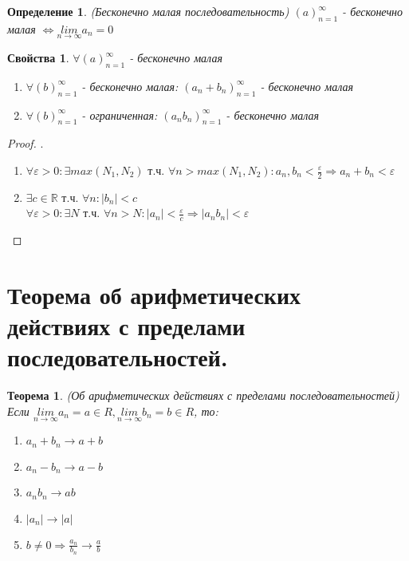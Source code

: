 \documentclass[12pt, a4]{article}
\newtheorem*{theorem}{Теорема}
\newtheorem*{definition}{Определение}
\newtheorem*{properties}{Свойства}
\renewcommand{\lim}[2]{\underset{#1 \rightarrow #2}{lim}}
\newcommand{\limn}{\lim{n}{\infty}}
\renewcommand{\implies}{\Rightarrow}
\renewcommand{\iff}{\Leftrightarrow}
\renewcommand{\epsilon}{\varepsilon}
\newcommand{\R}{\mathbb{R}}
\begin{document}
\begin{definition}(Бесконечно малая последовательность)
$(a)_{n=1}^\infty$ - бесконечно малая $\iff \limn a_n = 0$ 
\end{definition}

\begin{properties} $\forall (a)_{n=1}^\infty$ - бесконечно малая
\begin{enumerate}
    \item $\forall(b)_{n=1}^\infty$ - бесконечно малая: $(a_n + b_n)_{n=1}^\infty$ - бесконечно малая
    \item $\forall(b)_{n=1}^\infty$ - ограниченная: $(a_n b_n)_{n=1}^\infty$ - бесконечно малая
\end{enumerate}
\end{properties}

\begin{proof}.\\
\begin{enumerate}
    \item $\forall \epsilon > 0: \exists max(N_1, N_2)$ т.ч. $\forall n > max(N_1, N_2): a_n, b_n < \frac{\epsilon}{2} \implies a_n+b_n<\epsilon$
    \item $\exists c \in \R$ т.ч. $\forall n: |b_n|<c$\\
        $\forall \epsilon > 0: \exists N$ т.ч. $\forall n > N: |a_n| < \frac{\epsilon}{c} \implies |a_n b_n| < \epsilon$
\end{enumerate}
\end{proof}

\section{Теорема об арифметических действиях с пределами последовательностей.}

\begin{theorem}(Об арифметических действиях с пределами последовательностей)
Если $\limn a_n = a \in R, \limn b_n = b \in R$, то:
\begin{enumerate}
    \item $a_n+b_n \to a+b$
    \item $a_n-b_n \to a-b$
    \item $a_n b_n \to ab$
    \item $|a_n| \to |a|$
    \item $b \neq 0 \implies \frac{a_n}{b_n} \to \frac{a}{b}$
\end{enumerate}
\end{theorem}
\end{document}
